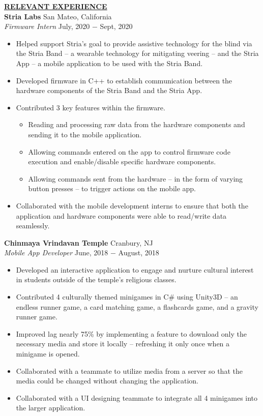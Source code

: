 \documentclass{article}
\begin{document}
\noindent \textbf{\underline{RELEVANT EXPERIENCE}} \\
\noindent \textbf{Stria Labs} \hfill San Mateo, California \\
\textit{Firmware Intern} \hfill July, 2020 $-$ Sept, 2020
\begin{itemize}[noitemsep,nolistsep,leftmargin=*]
\item {Helped support Stria's goal to provide assistive technology for the blind via the Stria Band -- a wearable technology for mitigating veering -- and the Stria App -- a mobile application to be used with the Stria Band.}
\item {Developed firmware in C++ to establish communication between the hardware components of the Stria Band and the Stria App.}
\item {Contributed 3 key features within the firmware.}
\begin{itemize}[noitemsep, nolistsep, leftmargin=*]
\item {Reading and processing raw data from the hardware components and sending it to the mobile application.}
\item {Allowing commands entered on the app to control firmware code execution and enable/disable specific hardware components.}
\item {Allowing commands sent from the hardware -- in the form of varying button presses -- to trigger actions on the mobile app.}
\end{itemize}
\item {Collaborated with the mobile development interns to ensure that both the application and hardware components were able to read/write data seamlessly.\\}
\end{itemize}

\noindent \textbf{Chinmaya Vrindavan Temple} \hfill Cranbury, NJ \\
\textit{Mobile App Developer} \hfill June, 2018 $-$ August, 2018
\begin{itemize}[noitemsep,nolistsep,leftmargin=*]
\item {Developed an interactive application to engage and nurture cultural interest in students outside of the temple's religious classes.}
\item {Contributed 4 culturally themed minigames in C\# using Unity3D -- an endless runner game, a card matching game, a flashcards game, and a gravity runner game.}
\item {Improved lag nearly 75\% by implementing a feature to download only the necessary media and store it locally -- refreshing it only once when a minigame is opened.}
\item {Collaborated with a teammate to utilize media from a server so that the media could be changed without changing the application. }
\item {Collaborated with a UI designing teammate to integrate all 4 minigames into the larger application.}\\
\end{itemize}
\end{document}
